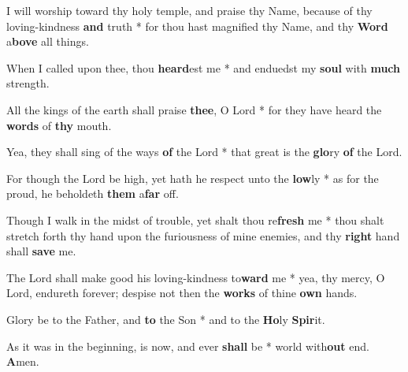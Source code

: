 \begin{multicols}{2}
	I will worship toward thy holy temple, and praise thy Name, because of thy loving-kindness \textbf{and} truth * for thou hast magnified thy Name, and thy \textbf{Word} a\textbf{bove} all things.
	
	When I called upon thee, thou \textbf{heard}est me * and enduedst my \textbf{soul} with \textbf{much} strength.
	
	All the kings of the earth shall praise \textbf{thee}, O Lord * for they have heard the \textbf{words} of \textbf{thy} mouth.
	
	Yea, they shall sing of the ways \textbf{of} the Lord * that great is the \textbf{glo}ry \textbf{of} the Lord.
	
	For though the Lord be high, yet hath he respect unto the \textbf{low}ly * as for the proud, he beholdeth \textbf{them} a\textbf{far} off.
	
	Though I walk in the midst of trouble, yet shalt thou re\textbf{fresh} me * thou shalt stretch forth thy hand upon the furiousness of mine enemies, and thy \textbf{right} hand shall \textbf{save} me.
	
	The Lord shall make good his loving-kindness to\textbf{ward} me * yea, thy mercy, O Lord, endureth forever; despise not then the \textbf{works} of thine \textbf{own} hands.
	
	Glory be to the Father, and \textbf{to} the Son * and to the \textbf{Ho}ly \textbf{Spir}it.
	
	As it was in the beginning, is now, and ever \textbf{shall} be * world with\textbf{out} end. \textbf{A}men.
\end{multicols} 